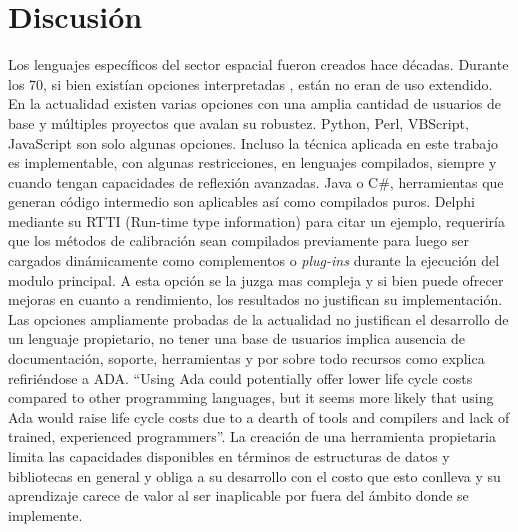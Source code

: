 \documentclass[twoside,twocolumn]{article}
\begin{document}
% 



\section{Discusión}	

Los lenguajes específicos del sector espacial fueron creados hace décadas. Durante los 70, si bien existían opciones interpretadas , están no eran de uso extendido. En la actualidad existen varias opciones con una amplia cantidad de usuarios de base y múltiples proyectos que avalan su robustez. Python, Perl, VBScript, JavaScript son solo algunas opciones. Incluso la técnica aplicada en este trabajo es implementable, con algunas restricciones, en lenguajes compilados, siempre y cuando tengan capacidades de reflexión avanzadas. Java o C\#, herramientas que generan código intermedio son aplicables así como compilados puros. Delphi mediante su RTTI (Run-time type information) para citar un ejemplo, requeriría que los métodos de calibración sean compilados previamente para luego ser cargados dinámicamente como complementos o \textit{plug-ins} durante la ejecución del modulo principal. A esta opción se la juzga mas compleja y si bien puede ofrecer mejoras en cuanto a rendimiento, los resultados no justifican su implementación. 
Las opciones ampliamente probadas de la actualidad no justifican el desarrollo de un lenguaje propietario, no tener una base de usuarios implica ausencia de documentación, soporte, herramientas y por sobre todo recursos como explica \cite{smith2003ada} refiriéndose a ADA. ``Using Ada could potentially offer lower life cycle costs compared to other programming languages, but it seems more likely that using Ada would raise life cycle costs due to a
dearth of tools and compilers and lack of trained, experienced programmers''. La creación de una herramienta propietaria limita las capacidades disponibles en términos de estructuras de datos y bibliotecas en general y obliga a su desarrollo con el costo que esto conlleva y su aprendizaje carece de valor al ser inaplicable por fuera del ámbito donde se implemente. 


\end{document}
